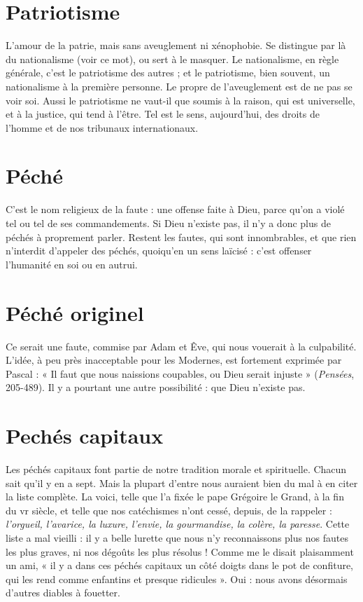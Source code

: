 \section{Patriotisme}
L'amour de la patrie, mais sans aveuglement ni xénophobie.
Se distingue par là du nationalisme (voir ce mot), ou sert à
le masquer. Le nationalisme, en règle générale, c’est le patriotisme des autres ;
et le patriotisme, bien souvent, un nationalisme à la première personne. Le
propre de l’aveuglement est de ne pas se voir soi. Aussi le patriotisme ne vaut-il
que soumis à la raison, qui est universelle, et à la justice, qui tend à l’être. Tel
est le sens, aujourd’hui, des droits de l’homme et de nos tribunaux internationaux.

\section{Péché}
C’est le nom religieux de la faute : une offense faite à Dieu, parce
qu’on a violé tel ou tel de ses commandements. Si Dieu n’existe pas,
il n’y a donc plus de péchés à proprement parler. Restent les fautes, qui sont
innombrables, et que rien n’interdit d’appeler des péchés, quoiqu’en un sens
laïcisé : c’est offenser l'humanité en soi ou en autrui.

\section{Péché originel}
Ce serait une faute, commise par Adam et Êve, qui nous
vouerait à la culpabilité. L’idée, à peu près inacceptable
pour les Modernes, est fortement exprimée par Pascal : « Il faut que nous naissions
coupables, ou Dieu serait injuste » ({\it Pensées}, 205-489). Il y a pourtant une
autre possibilité : que Dieu n'existe pas.

\section{Pechés capitaux}
Les péchés capitaux font partie de notre tradition morale
et spirituelle. Chacun sait qu’il y en a sept. Mais la
plupart d’entre nous auraient bien du mal à en citer la liste complète. La
voici, telle que l’a fixée le pape Grégoire le Grand, à la fin du vr siècle, et telle
que nos catéchismes n’ont cessé, depuis, de la rappeler : {\it l'orgueil, l'avarice, la
luxure, l'envie, la gourmandise, la colère, la paresse}. Cette liste a mal vieilli : il y a
belle lurette que nous n’y reconnaissons plus nos fautes les plus graves, ni nos
dégoûts les plus résolus ! Comme me le disait plaisamment un ami, « il y a dans
ces péchés capitaux un côté doigts dans le pot de confiture, qui les rend comme
enfantins et presque ridicules ». Oui : nous avons désormais d’autres diables à
fouetter.

